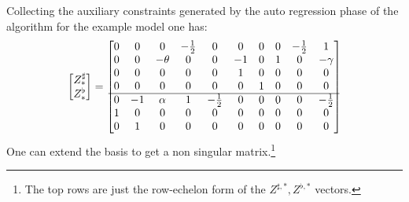 Collecting the  auxiliary constraints generated by the 
auto regression phase of the algorithm for the example model one has:
  \begin{gather*}
    \begin{bmatrix}
Z^\sharp_\ast\\Z^\flat_\ast
    \end{bmatrix}
=  \begin{bmatrix}
0 & 0 & 0 & -{\frac{1}{2}} & 0 & 0 & 0 & 0
  & -{\frac{1}{2}} & 1\\
0 & 0 & -\theta & 0 & 0 & -1 & 0 & 1 &
  0 & -\gamma\\
0 & 0 & 0 & 0 & 0 & 1 & 0 & 0 & 0
  & 0\\
0 & 0 & 0 & 0 & 0 & 0 & 1 & 0 & 0
  & 0\\
\hline
0 & -1 & \alpha & 1 & -{\frac{1}{2}} & 0 & 0
  & 0 & 0 & -{\frac{1}{2}}\\
1 & 0 & 0 & 0 & 0 & 0 & 0 & 0 & 0
  & 0\\
0 & 1 & 0 & 0 & 0 & 0 & 0 & 0 & 0
  & 0
  \end{bmatrix}
  \end{gather*}
One can extend  the basis to get a non singular
matrix.\footnote{The top rows are just the row-echelon form of the $Z^{\sharp,\ast},Z^{\flat,\ast}$ vectors.}
